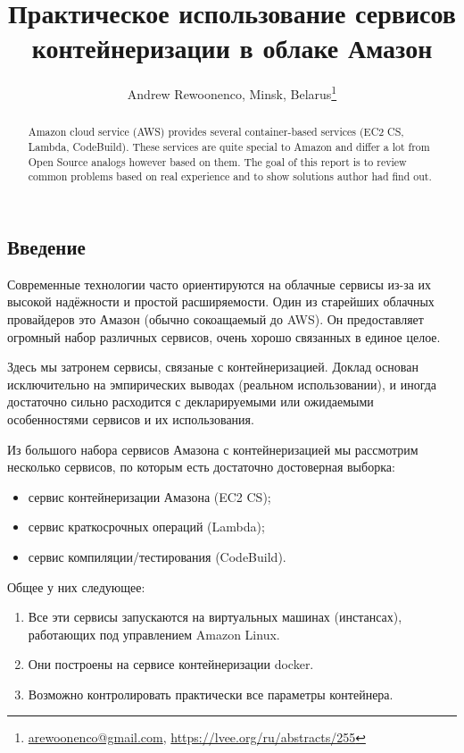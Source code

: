 \documentclass[10pt, a5paper]{article}
\begin{document}
\title{Практическое использование сервисов контейнеризации в облаке Амазон}
\author{Andrew Rewoonenco, Minsk, Belarus\footnote{\url{arewoonenco@gmail.com}, \url{https://lvee.org/ru/abstracts/255}}}
\maketitle
\begin{abstract}
Amazon cloud service (AWS) provides several container-based services (EC2 CS, Lambda, CodeBuild). These services are quite special to Amazon and differ a lot from Open Source analogs however based on them. The goal of this report is to review common problems based on real experience and to show solutions author had find out.
\end{abstract}

\subsection*{Введение}
Современные технологии часто ориентируются на облачные сервисы из-за их
высокой надёжности и простой расширяемости. Один из старейших облачных
провайдеров это Амазон (обычно сокоащаемый до AWS). Он предоставляет
огромный набор различных сервисов, очень хорошо связанных в единое целое.

Здесь мы затронем сервисы, связаные с контейнеризацией.
Доклад основан исключительно на эмпирических выводах (реальном
использовании), и иногда достаточно сильно расходится с декларируемыми или
ожидаемыми особенностями сервисов и их использования.

Из большого набора сервисов Амазона с контейнеризацией мы рассмотрим
несколько сервисов, по которым есть достаточно достоверная выборка:

\begin{itemize}
\item сервис контейнеризации Амазона (EC2 CS);
\item сервис краткосрочных операций (Lambda);
\item сервис компиляции/тестирования (CodeBuild).
\end{itemize}

Общее у них следующее:

\begin{enumerate}
\item Все эти сервисы запускаются на виртуальных машинах (инстансах), работающих под управлением Amazon Linux.
\item Они построены на сервисе контейнеризации docker.
\item Возможно контролировать практически все параметры контейнера.
\end{enumerate}
\end{document}
